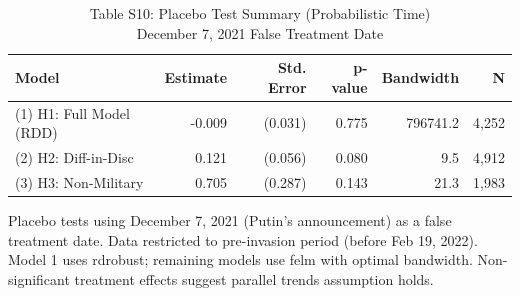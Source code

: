 \begin{table}[!t]
\caption*{
{\large Table S10: Placebo Test Summary (Probabilistic Time)} \\ 
{\small December 7, 2021 False Treatment Date}
} 
\fontsize{12.0pt}{14.4pt}\selectfont
\begin{tabular*}{\linewidth}{@{\extracolsep{\fill}}lrrrrr}
\toprule
Model & Estimate & Std. Error & p-value & Bandwidth & N \\ 
\midrule\addlinespace[2.5pt]
(1) H1: Full Model (RDD) & -0.009 & (0.031) & 0.775 & 796741.2 & 4,252 \\ 
(2) H2: Diff-in-Disc & 0.121 & (0.056) & 0.080 & 9.5 & 4,912 \\ 
(3) H3: Non-Military & 0.705 & (0.287) & 0.143 & 21.3 & 1,983 \\ 
\bottomrule
\end{tabular*}
\begin{minipage}{\linewidth}
Placebo tests using December 7, 2021 (Putin's announcement) as a false treatment
date. Data restricted to pre-invasion period (before Feb 19, 2022). Model 1
uses rdrobust; remaining models use felm with optimal bandwidth. Non-significant
treatment effects suggest parallel trends assumption holds.\\
\end{minipage}
\end{table}

